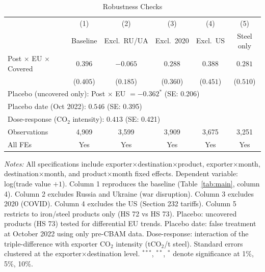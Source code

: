 \begin{table}[htbp]
\centering
\caption{Robustness Checks}
\label{tab:robustness}
\begin{tabular}{lccccc}
\hline\hline
 & (1) & (2) & (3) & (4) & (5) \\
 & Baseline & Excl.\ RU/UA & Excl.\ 2020 & Excl.\ US & Steel only \\
\hline
Post $\times$ EU $\times$ Covered & $0.396$ & $-0.065$ & $0.288$ & $0.388$ & $0.281$ \\
 & ($0.405$) & ($0.185$) & ($0.360$) & ($0.451$) & ($0.510$) \\
\hline
\multicolumn{5}{l}{Placebo (uncovered only): Post $\times$ EU $= -0.362^{*}$ (SE: 0.206)} \\
\multicolumn{5}{l}{Placebo date (Oct 2022): $0.546$ (SE: 0.395)} \\
\multicolumn{5}{l}{Dose-response (CO$_2$ intensity): $0.413$ (SE: 0.421)} \\
\hline
Observations & 4,909 & 3,599 & 3,909 & 3,675 & 3,251 \\
All FEs & Yes & Yes & Yes & Yes & Yes \\
\hline\hline
\end{tabular}
\begin{tablenotes}[flushleft]
\small
\item \textit{Notes:} All specifications include exporter$\times$destination$\times$product, exporter$\times$month, destination$\times$month, and product$\times$month fixed effects. Dependent variable: log(trade value $+ 1$). Column 1 reproduces the baseline (Table~\ref{tab:main}, column 4). Column 2 excludes Russia and Ukraine (war disruption). Column 3 excludes 2020 (COVID). Column 4 excludes the US (Section 232 tariffs). Column 5 restricts to iron/steel products only (HS 72 vs HS 73). Placebo: uncovered products (HS 73) tested for differential EU trends. Placebo date: false treatment at October 2022 using only pre-CBAM data. Dose-response: interaction of the triple-difference with exporter CO$_2$ intensity (tCO$_2$/t steel). Standard errors clustered at the exporter$\times$destination level. $^{***}$, $^{**}$, $^{*}$ denote significance at 1\%, 5\%, 10\%.
\end{tablenotes}
\end{table}
